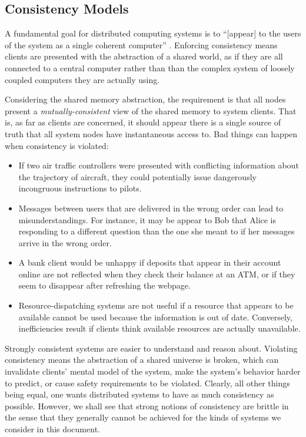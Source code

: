 \documentclass[]             %
{NASA}                       %
\theoremstyle{definition}
\begin{document}
\subsection{Consistency Models}
\label{memory-consistency-models}

A fundamental goal for distributed computing systems is to
``{[}appear{]} to the users of the system as a single coherent
computer'' \cite{TanenbaumSteen07}. Enforcing consistency means
clients are presented with the abstraction of a shared world, as if
they are all connected to a central computer rather than than the
complex system of loosely coupled computers they are actually using.

Considering the shared memory abstraction, the requirement is that all
nodes present a \emph{mutually-consistent} view of the shared memory
to system clients. That is, as far as clients are concerned, it should
appear there is a single source of truth that all system nodes have
instantaneous access to. Bad things can happen when consistency is
violated:

\begin{itemize}
\item If two air traffic controllers were presented with conflicting
  information about the trajectory of aircraft, they could potentially
  issue dangerously incongruous instructions to pilots.
\item Messages between users that are delivered in the wrong order can
  lead to misunderstandings. For instance, it may be appear to Bob
  that Alice is responding to a different question than the one she
  meant to if her messages arrive in the wrong order.
\item A bank client would be unhappy if deposits that appear in their
  account online are not reflected when they check their balance at an
  ATM, or if they seem to disappear after refreshing the webpage.
\item Resource-dispatching systems are not useful if a resource that
  appears to be available cannot be used because the information is
  out of date. Conversely, inefficiencies result if clients think
  available resources are actually unavailable.
\end{itemize}

Strongly consistent systems are easier to understand and reason
about. Violating consistency means the abstraction of a shared
universe is broken, which can invalidate clients' mental model of the
system, make the system's behavior harder to predict, or cause safety
requirements to be violated. Clearly, all other things being equal,
one wants distributed systems to have as much consistency as
possible. However, we shall see that strong notions of consistency are
brittle in the sense that they generally cannot be achieved for the
kinds of systems we consider in this document.
\end{document}
